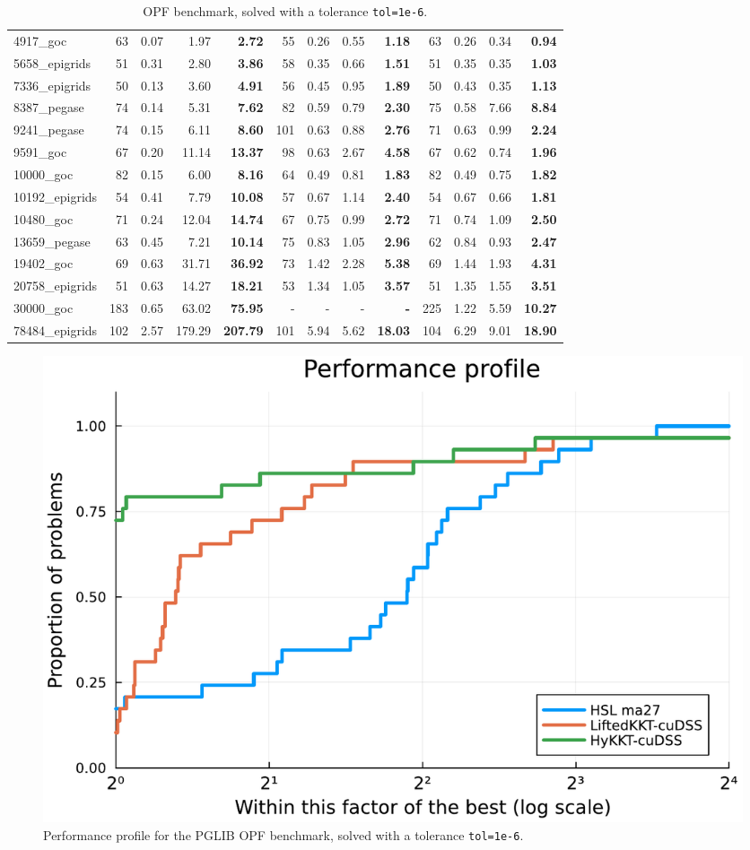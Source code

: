 \begin{table}[!ht]
{\begin{tabular}{|l|rrr >{\bfseries}r|rrr >{\bfseries}r|rrr >{\bfseries}r|}
      \hline
      4917\_goc & 63 & 0.07 & 1.97 & 2.72 & 55 & 0.26 & 0.55 & 1.18 & 63 & 0.26 & 0.34 & 0.94 \\
      5658\_epigrids & 51 & 0.31 & 2.80 & 3.86 & 58 & 0.35 & 0.66 & 1.51 & 51 & 0.35 & 0.35 & 1.03 \\
      7336\_epigrids & 50 & 0.13 & 3.60 & 4.91 & 56 & 0.45 & 0.95 & 1.89 & 50 & 0.43 & 0.35 & 1.13 \\
      8387\_pegase & 74 & 0.14 & 5.31 & 7.62 & 82 & 0.59 & 0.79 & 2.30 & 75 & 0.58 & 7.66 & 8.84 \\
      9241\_pegase & 74 & 0.15 & 6.11 & 8.60 & 101 & 0.63 & 0.88 & 2.76 & 71 & 0.63 & 0.99 & 2.24 \\
      \hline
      9591\_goc & 67 & 0.20 & 11.14 & 13.37 & 98 & 0.63 & 2.67 & 4.58 & 67 & 0.62 & 0.74 & 1.96 \\
      10000\_goc & 82 & 0.15 & 6.00 & 8.16 & 64 & 0.49 & 0.81 & 1.83 & 82 & 0.49 & 0.75 & 1.82 \\
      10192\_epigrids & 54 & 0.41 & 7.79 & 10.08 & 57 & 0.67 & 1.14 & 2.40 & 54 & 0.67 & 0.66 & 1.81 \\
      10480\_goc & 71 & 0.24 & 12.04 & 14.74 & 67 & 0.75 & 0.99 & 2.72 & 71 & 0.74 & 1.09 & 2.50 \\
      13659\_pegase & 63 & 0.45 & 7.21 & 10.14 & 75 & 0.83 & 1.05 & 2.96 & 62 & 0.84 & 0.93 & 2.47 \\
      \hline
      19402\_goc & 69 & 0.63 & 31.71 & 36.92 & 73 & 1.42 & 2.28 & 5.38 & 69 & 1.44 & 1.93 & 4.31 \\
      20758\_epigrids & 51 & 0.63 & 14.27 & 18.21 & 53 & 1.34 & 1.05 & 3.57 & 51 & 1.35 & 1.55 & 3.51 \\
      30000\_goc & 183 & 0.65 & 63.02 & 75.95 & - & - & - & - & 225 & 1.22 & 5.59 & 10.27 \\
      78484\_epigrids & 102 & 2.57 & 179.29 & 207.79 & 101 & 5.94 & 5.62 & 18.03 & 104 & 6.29 & 9.01 & 18.90 \\
      \hline
    \end{tabular}
  }
  \caption{OPF benchmark, solved with a tolerance {\tt tol=1e-6}. \label{tab:opf:benchmark}}
\end{table}

\begin{figure}[!ht]
  \centering
  \includegraphics[width=.6\textwidth]{figures/pprof-cuda.pdf}
  \caption{Performance profile for the PGLIB OPF benchmark, solved
    with a tolerance {\tt tol=1e-6}.
  \label{fig:opf:pprof}}
\end{figure}

